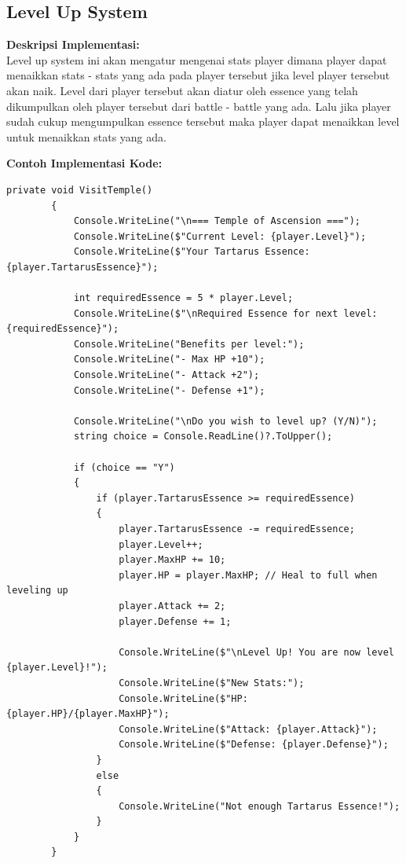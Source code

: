 \documentclass[12pt]{article}
\begin{document}
\subsection{Level Up System}
\textbf{Deskripsi Implementasi:} \\
Level up system ini akan mengatur mengenai stats player dimana player dapat menaikkan stats - stats yang ada pada player tersebut jika level player tersebut akan naik. Level dari player tersebut akan diatur oleh essence yang telah dikumpulkan oleh player tersebut dari battle - battle yang ada. Lalu jika player sudah cukup mengumpulkan essence tersebut maka player dapat menaikkan level untuk menaikkan stats yang ada.

\textbf{Contoh Implementasi Kode:}
\begin{lstlisting}[language=CSharp, caption=Contoh Implementasi Boss Fight System]
private void VisitTemple()
        {
            Console.WriteLine("\n=== Temple of Ascension ===");
            Console.WriteLine($"Current Level: {player.Level}");
            Console.WriteLine($"Your Tartarus Essence: {player.TartarusEssence}");
            
            int requiredEssence = 5 * player.Level;
            Console.WriteLine($"\nRequired Essence for next level: {requiredEssence}");
            Console.WriteLine("Benefits per level:");
            Console.WriteLine("- Max HP +10");
            Console.WriteLine("- Attack +2");
            Console.WriteLine("- Defense +1");
            
            Console.WriteLine("\nDo you wish to level up? (Y/N)");
            string choice = Console.ReadLine()?.ToUpper();

            if (choice == "Y")
            {
                if (player.TartarusEssence >= requiredEssence)
                {
                    player.TartarusEssence -= requiredEssence;
                    player.Level++;
                    player.MaxHP += 10;
                    player.HP = player.MaxHP; // Heal to full when leveling up
                    player.Attack += 2;
                    player.Defense += 1;
                    
                    Console.WriteLine($"\nLevel Up! You are now level {player.Level}!");
                    Console.WriteLine($"New Stats:");
                    Console.WriteLine($"HP: {player.HP}/{player.MaxHP}");
                    Console.WriteLine($"Attack: {player.Attack}");
                    Console.WriteLine($"Defense: {player.Defense}");
                }
                else
                {
                    Console.WriteLine("Not enough Tartarus Essence!");
                }
            }
        }
\end{lstlisting}
\end{document}
